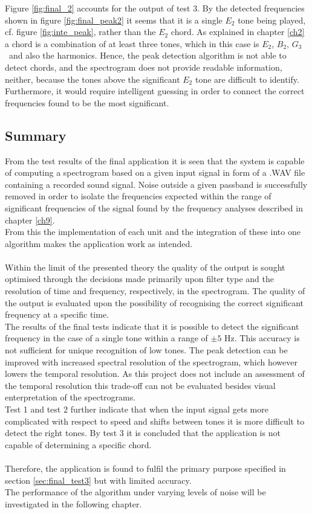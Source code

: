 Figure \ref{fig:final_2} accounts for the output of test 3. By the detected frequencies shown in figure \ref{fig:final_peak2} it seems that it is a single $E_2$ tone being played, cf. figure \ref{fig:inte_peak}, rather than the $E_2$ chord. As explained in chapter \ref{ch2} a chord is a combination of at least three tones, which in this case is $E_2$, $B_2$, $G_3$\hashsharp \ and also the harmonics. Hence, the peak detection algorithm is not able to detect chords, and the spectrogram does not provide readable information, neither, because the tones above the significant $E_2$ tone are difficult to identify. Furthermore, it would require intelligent guessing in order to connect the correct frequencies found to be the most significant.

\subsection{Summary}
From the test results of the final application it is seen that the system is capable of computing a spectrogram based on a given input signal in form of a .WAV file containing a recorded sound signal. Noise outside a given passband is successfully removed in order to isolate the frequencies expected within the range of significant frequencies of the signal found by the frequency analyses described in chapter \ref{ch9}. \\
From this the implementation of each unit and the integration of these into one algorithm makes the application work as intended. \\
\\
Within the limit of the presented theory the quality of the output is sought optimised through the decisions made primarily upon filter type and the resolution of time and frequency, respectively, in the spectrogram.
The quality of the output is evaluated upon the possibility of recognising the correct significant frequency at a specific time. \\
The results of the final tests indicate that it is possible to detect the significant frequency in the case of a single tone within a range of $\pm 5$ Hz. This accuracy is not sufficient for unique recognition of low tones. The peak detection can be improved with increased spectral resolution of the spectrogram, which however lowers the temporal resolution. As this project does not include an assessment of the temporal resolution this trade-off can not be evaluated besides visual enterpretation of the spectrograms. \\        
Test 1 and test 2 further indicate that when the input signal gets more complicated with respect to speed and shifts between tones it is more difficult to detect the right tones. By test 3 it is concluded that the application is not capable of determining a specific chord. \\   
\\
Therefore, the application is found to fulfil the primary purpose specified in section \ref{sec:final_test3} but with limited accuracy.\\
The performance of the algorithm under varying levels of noise will be investigated in the following chapter.